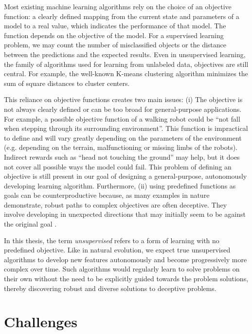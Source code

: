 Most existing machine learning algorithms rely on the choice of an objective
function: a clearly defined mapping from the current state and parameters of a
model to a real value, which indicates the performance of that model. The
function depends on the objective of the model. For a supervised learning
problem, we may count the number of misclassified objects or the distance
between the predictions and the expected results. Even in unsupervised learning,
the family of algorithms used for learning from unlabeled data, objectives are
still central. For example, the well-known K-means clustering algorithm minimizes
the sum of square distances to cluster centers.

This reliance on objective functions creates two main issues: (i) The objective
is not always clearly defined or can be too broad for general-purpose
applications. For example, a possible objective function of a walking robot
could be ``not fall when stepping through its surrounding environment''. This
function is impractical to define and will vary greatly depending on the
parameters of the environment (e.g. depending on the terrain, malfunctioning or 
missing limbs of the robots). Indirect rewards such as ``head not touching the ground''
may help, but it does not cover all possible ways the model could fail. 
This problem of defining an objective is still present in our goal of designing
a general-purpose, autonomously developing learning algorithm.
Furthermore, (ii) using predefined functions as goals can be counterproductive
because, as many examples in nature demonstrate, robust paths to complex
objectives are often deceptive. They involve developing in unexpected directions
that may initially seem to be against the original goal
\parencite{stanleyWhyGreatnessCannot2015}.

In this thesis, the term \emph{unsupervised} refers to a form of learning with
no predefined objective. Like in natural evolution, we expect true unsupervised
algorithms to develop new features autonomously and become progressively more
complex over time. Such algorithms would regularly learn to solve problems on
their own without the need to be explicitly guided towards the problem solutions, 
thereby discovering robust
and diverse solutions to deceptive problems.


\section{Challenges}\label{sec:challenges}

